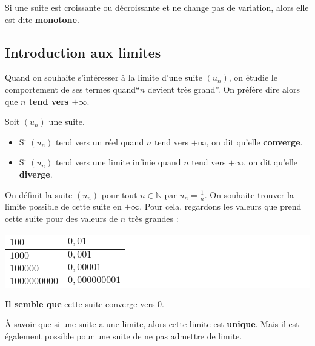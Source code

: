 	Si une suite est croissante ou décroissante et ne change pas de variation, alors elle est dite \textbf{monotone}.

	\subsection{Introduction aux limites}

	Quand on souhaite s'intéresser à la limite d'une suite $(u_n)$, on étudie le comportement de ses termes quand``$n$ devient très grand''. On préfère dire alors que \textbf{$n$ tend vers $+\infty$}.

	\begin{formula}[Définition]
		Soit $(u_n)$ une suite.
		\begin{itemize}
			\item Si $(u_n)$ tend vers un réel quand $n$ tend vers $+\infty$, on dit qu'elle \textbf{converge}.
			\item Si $(u_n)$ tend vers une limite infinie quand $n$ tend vers $+\infty$, on dit qu'elle \textbf{diverge}.
		\end{itemize}
	\end{formula}

	\begin{tip}[Exemple]
		On définit la suite $(u_n)$ pour tout $n \in \mathbb{N}$ par $u_n = \frac{1}{n}$. On souhaite trouver la limite possible de cette suite en $+ \infty$.
		\newline
		Pour cela, regardons les valeurs que prend cette suite pour des valeurs de $n$ très grandes :
		\newpar
		\begingroup\setlength{\fboxsep}{0pt}
		\colorbox{white}{%
			\begin{tabularx}{\textwidth}{|X|X|}
				\hline
				$100$ & $0,01$ \\
				\hline
				$1 000$ & $0,001$ \\
				\hline
				$100 000$ & $0,000 01$ \\
				\hline
				$1 000 000 000$ & $0,000 000 001$ \\
				\hline
			\end{tabularx}%
		}
		\endgroup
		\newpar
		\textbf{Il semble que} cette suite converge vers 0.
	\end{tip}

	À savoir que si une suite a une limite, alors cette limite est \textbf{unique}. Mais il est également possible pour une suite de ne pas admettre de limite.


